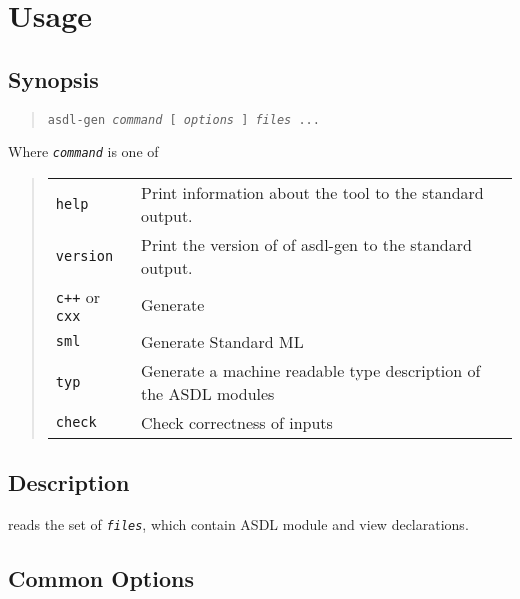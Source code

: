%
\chapter{Usage}
\label{chap:usage}

\section*{Synopsis}
\begin{quote}
  \texttt{asdl-gen \textit{command} [ \textit{options} ] \textit{files} ...}
\end{quote}%
%
Where \texttt{\textit{command}} is one of
\begin{quote}
  \begin{tabular}{ll}
    \texttt{help}
      & Print information about the \asdlgen{} tool to the standard output. \\
    \texttt{version}
      & Print the version of of asdl-gen to the standard output. \\
    \texttt{c++} or \texttt{cxx}
      & Generate \Cplusplus{} \\
    \texttt{sml}
      & Generate Standard ML \\
    \texttt{typ}
      & Generate a machine readable type description of the ASDL modules \\
    \texttt{check}
      & Check correctness of inputs \\
  \end{tabular}%
\end{quote}%

\section*{Description}
\asdlgen{} reads the set of \texttt{\textit{files}}, which contain ASDL module
and view declarations.

\section*{Common Options}

